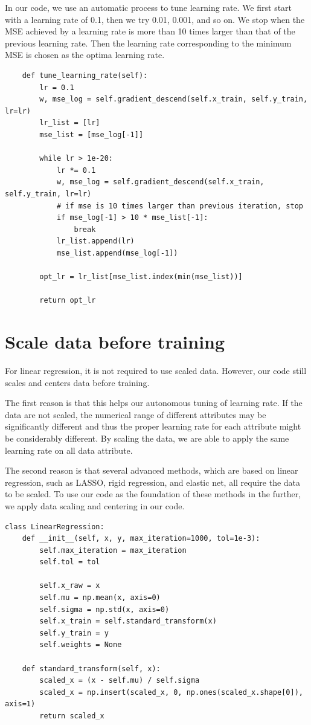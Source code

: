 \documentclass[
	letterpaper
]{article}
\begin{document}
In our code, we use an automatic process to tune learning rate. 
We first start with a learning rate of 0.1, then we try 0.01, 0.001, and so on.
We stop when the MSE achieved by a learning rate is more than 10 times larger than that of the previous learning rate.
Then the learning rate corresponding to the minimum MSE is chosen as the optima learning rate.
\begin{lstlisting}
    def tune_learning_rate(self):
        lr = 0.1
        w, mse_log = self.gradient_descend(self.x_train, self.y_train, lr=lr)
        lr_list = [lr]
        mse_list = [mse_log[-1]]

        while lr > 1e-20:
            lr *= 0.1
            w, mse_log = self.gradient_descend(self.x_train, self.y_train, lr=lr)
            # if mse is 10 times larger than previous iteration, stop
            if mse_log[-1] > 10 * mse_list[-1]:
                break
            lr_list.append(lr)
            mse_list.append(mse_log[-1])

        opt_lr = lr_list[mse_list.index(min(mse_list))]

        return opt_lr
\end{lstlisting}

\section{Scale data before training}
For linear regression, it is not required to use scaled data.
However, our code still scales and centers data before training.

The first reason is that this helps our autonomous tuning of learning rate.
If the data are not scaled, the numerical range of different attributes may be significantly different and thus the proper learning rate for each attribute might be considerably different.
By scaling the data, we are able to apply the same learning rate on all data attribute. 

The second reason is that several advanced methods, which are based on linear regression, such as LASSO, rigid regression, and elastic net, all require the data to be scaled.
To use our code as the foundation of these methods in the further, we apply data scaling and centering in our code.
\begin{lstlisting}
class LinearRegression:
    def __init__(self, x, y, max_iteration=1000, tol=1e-3):
        self.max_iteration = max_iteration
        self.tol = tol
        
        self.x_raw = x
        self.mu = np.mean(x, axis=0)
        self.sigma = np.std(x, axis=0)
        self.x_train = self.standard_transform(x)
        self.y_train = y
        self.weights = None
        
    def standard_transform(self, x):
        scaled_x = (x - self.mu) / self.sigma
        scaled_x = np.insert(scaled_x, 0, np.ones(scaled_x.shape[0]), axis=1)
        return scaled_x
\end{lstlisting}
\end{document}

